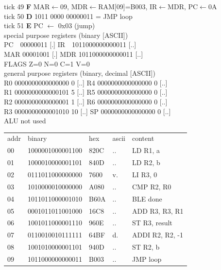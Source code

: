 \noindent\begin{tcolorbox}[stepbox, title={Instruction 17 \hfill ticks 49 to 51 \quad JMP loop}]
\textcolor{dim}{tick 49} \textbf{F} MAR$\leftarrow$09, MDR$\leftarrow$RAM[09]=B003, IR$\leftarrow$MDR, PC$\leftarrow$0A\\
\textcolor{dim}{tick 50} \textbf{D} 1011 0000 00000011 = JMP loop\\
\textcolor{dim}{tick 51} \textbf{E} PC $\leftarrow$ 0x03 (jump)\\[2pt]
\textcolor{dim}{special purpose registers (binary [ASCII])}\\
PC~~00000011 [.] \hfill IR~~1011000000000011 [..]\\
MAR 00001001 [.] \hfill MDR 1011000000000011 [..]\\
FLAGS Z=0 N=0 C=1 V=0\\[2pt]
\textcolor{dim}{general purpose registers (binary, decimal [ASCII])}\\
R0 0000000000000000 0 [..] \hfill R4 0000000000000000 0 [..]\\
R1 0000000000000101 5 [..] \hfill R5 0000000000000000 0 [..]\\
R2 0000000000000001 1 [..] \hfill R6 0000000000000000 0 [..]\\
R3 0000000000001010 10 [..] \hfill SP 0000000000000000 0 [..]\\
\textcolor{dim}{ALU not used}\\[2pt]
{\setlength{\tabcolsep}{2pt}\begin{tabular}{@{}lllll@{}}
\textcolor{dim}{addr} & \textcolor{dim}{binary} & \textcolor{dim}{hex} & \textcolor{dim}{ascii} & \textcolor{dim}{content}\\
00 & 1000001000001100 & 820C & .. & LD R1, a\\
01 & 1000010000001101 & 840D & .. & LD R2, b\\
02 & 0111011000000000 & 7600 & v. & LI R3, 0\\
\rowcolor{pcc}03 & 1010000010000000 & A080 & .. & CMP R2, R0\\
04 & 1011011000001010 & B60A & .. & BLE done\\
05 & 0001011011001000 & 16C8 & .. & ADD R3, R3, R1\\
06 & 1001011000001110 & 960E & .. & ST R3, result\\
07 & 0110010010111111 & 64BF & d. & ADDI R2, R2, -1\\
08 & 1001010000001101 & 940D & .. & ST R2, b\\
09 & 1011000000000011 & B003 & .. & JMP loop\\

\end{tabular}}
\end{tcolorbox}
